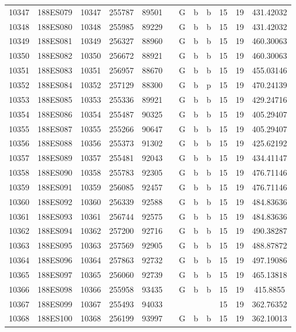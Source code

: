\begin{tabular}{|*{12}{c|}}
10347 & 188ES079 & 10347 & 255787 & 89501 &  & G & b & b & 15 & 19 & 431.42032 \\ 
10348 & 188ES080 & 10348 & 255985 & 89229 &  & G & b & b & 15 & 19 & 431.42032 \\ 
10349 & 188ES081 & 10349 & 256327 & 88960 &  & G & b & b & 15 & 19 & 460.30063 \\ 
10350 & 188ES082 & 10350 & 256672 & 88921 &  & G & b & b & 15 & 19 & 460.30063 \\ 
10351 & 188ES083 & 10351 & 256957 & 88670 &  & G & b & b & 15 & 19 & 455.03146 \\ 
10352 & 188ES084 & 10352 & 257129 & 88300 &  & G & b & p & 15 & 19 & 470.24139 \\ 
10353 & 188ES085 & 10353 & 255336 & 89921 &  & G & b & b & 15 & 19 & 429.24716 \\ 
10354 & 188ES086 & 10354 & 255487 & 90325 &  & G & b & b & 15 & 19 & 405.29407 \\ 
10355 & 188ES087 & 10355 & 255266 & 90647 &  & G & b & b & 15 & 19 & 405.29407 \\ 
10356 & 188ES088 & 10356 & 255373 & 91302 &  & G & b & b & 15 & 19 & 425.62192 \\ 
10357 & 188ES089 & 10357 & 255481 & 92043 &  & G & b & b & 15 & 19 & 434.41147 \\ 
10358 & 188ES090 & 10358 & 255783 & 92305 &  & G & b & b & 15 & 19 & 476.71146 \\ 
10359 & 188ES091 & 10359 & 256085 & 92457 &  & G & b & b & 15 & 19 & 476.71146 \\ 
10360 & 188ES092 & 10360 & 256339 & 92588 &  & G & b & b & 15 & 19 & 484.83636 \\ 
10361 & 188ES093 & 10361 & 256744 & 92575 &  & G & b & b & 15 & 19 & 484.83636 \\ 
10362 & 188ES094 & 10362 & 257200 & 92716 &  & G & b & b & 15 & 19 & 490.38287 \\ 
10363 & 188ES095 & 10363 & 257569 & 92905 &  & G & b & b & 15 & 19 & 488.87872 \\ 
10364 & 188ES096 & 10364 & 257863 & 92732 &  & G & b & b & 15 & 19 & 497.19086 \\ 
10365 & 188ES097 & 10365 & 256060 & 92739 &  & G & b & b & 15 & 19 & 465.13818 \\ 
10366 & 188ES098 & 10366 & 255958 & 93435 &  & G & b & b & 15 & 19 & 415.8855 \\ 
10367 & 188ES099 & 10367 & 255493 & 94033 &  &  &  &  & 15 & 19 & 362.76352 \\ 
10368 & 188ES100 & 10368 & 256199 & 93997 &  & G & b & b & 15 & 19 & 362.10013 \\ 

\end{tabular}

